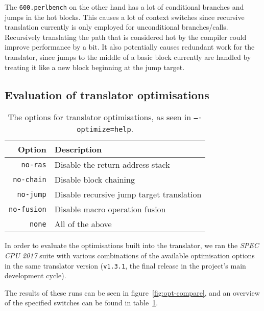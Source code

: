 The \texttt{600.perlbench} on the other hand has a lot of conditional branches and jumps in the hot blocks.
This causes a lot of context switches since recursive translation currently is only employed for unconditional branches/calls.
Recursively translating the path that is considered hot by the compiler could improve performance by a bit.
It also potentially causes redundant work for the translator, since jumps to the middle of a basic block currently are handled by treating it like a new block beginning at the jump target.



\subsection{Evaluation of translator optimisations}
\begin{table}
	\centering
	\begin{tabular}{rl}
		\toprule
		\textbf{Option} & \textbf{Description}\\
		\midrule
		\texttt{no-ras} & Disable the return address stack\\
		\texttt{no-chain} & Disable block chaining\\
		\texttt{no-jump} & Disable recursive jump target translation\\
		\texttt{no-fusion} & Disable macro operation fusion\\
		\texttt{none} & All of the above\\
		\bottomrule
	\end{tabular}
	\caption[Translator optimisation options]%
	{The options for translator optimisations, as seen in \texttt{----optimize=help}.}
	\label{tab:opt-options}
\end{table}

In order to evaluate the optimisations built into the translator, we ran the \textit{SPEC CPU 2017} suite with various combinations of the available optimisation options in the same translator version (\texttt{v1.3.1}, the final release in the project's main development cycle).

The results of these runs can be seen in figure~\ref{fig:opt-compare}, and an overview of the specified switches can be found in table~\ref{tab:opt-options}.

\basetable
{}\norastable
{}\nofusiontable
{}\nojumpnorastable
{}\nonetable

